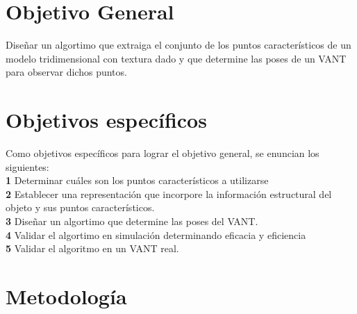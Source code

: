 \documentclass[]{report}
\begin{document}
\section{Objetivo General}
 Diseñar un algortimo que extraiga el conjunto de los puntos característicos de un modelo tridimensional con textura dado y que determine las poses de un VANT para observar dichos puntos.

\section{Objetivos específicos}
Como objetivos específicos para lograr el objetivo general, se enuncian los siguientes:\\
 \textbf {1} Determinar cuáles son los puntos característicos a utilizarse\\
 \textbf {2} Establecer una representación que incorpore la información estructural del objeto y sus puntos característicos.\\
\textbf {3} Diseñar un algortimo que determine las poses del VANT.\\
\textbf {4} Validar el algortimo en simulación determinando eficacia  y eficiencia\\
\textbf{5} Validar el algoritmo en un VANT real.


\section{Metodología}
\end{document}
